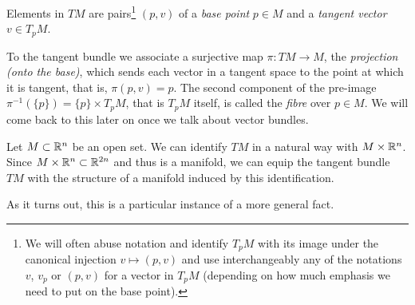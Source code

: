 Elements in $TM$ are pairs\footnote{We will often abuse notation and identify $T_pM$ with its image under the canonical injection $v\mapsto(p,v)$ and use interchangeably any of the notations $v$, $v_p$ or $(p,v)$ for a vector in $T_pM$ (depending on how much emphasis we need to put on the base point).} $(p,v)$ of a \emph{base point} $p\in M$ and a \emph{tangent vector} $v\in T_pM$.

To the tangent bundle we associate a surjective map $\pi:TM \to M$, the \emph{projection (onto the base)}, which sends each vector in a tangent space to the point at which it is tangent, that is, $\pi(p,v) = p$.
The second component of the pre-image $\pi^{-1}(\{p\}) = \{p\}\times T_pM$, that is $T_pM$ itself, is called the \emph{fibre} over $p\in M$.
We will come back to this later on once we talk about vector bundles.

\begin{example}
	Let $M\subset \mathbb{R}^n$ be an open set.
	We can identify $TM$ in a natural way with $M\times\mathbb{R}^n$.
	Since $M\times\mathbb{R}^n \subset \mathbb{R}^{2n}$ and thus is a manifold, we can equip the tangent bundle $TM$ with the structure of a manifold induced by this identification.
\end{example}

As it turns out, this is a particular instance of a more general fact.

